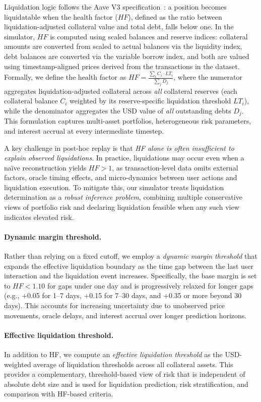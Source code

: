 \documentclass[manuscript,screen,review]{acmart}
\begin{document}
Liquidation logic follows the Aave V3 specification~\cite{aave_liquidations}: a position becomes liquidatable when the health factor ($HF$), defined as the ratio between liquidation-adjusted collateral value and total debt, falls below one. In the simulator, $HF$ is computed using scaled balances and reserve indices: collateral amounts are converted from scaled to actual balances via the liquidity index, debt balances are converted via the variable borrow index, and both are valued using timestamp-aligned prices derived from the transactions in the dataset. Formally, we define the health factor as $HF = \frac{\sum_{i} C_i \cdot LT_i}{\sum_{j} D_j}$, where the numerator aggregates liquidation-adjusted collateral across \emph{all} collateral reserves (each collateral balance $C_i$ weighted by its reserve-specific liquidation threshold $LT_i$), while the denominator aggregates the USD value of \emph{all} outstanding debts $D_j$. This formulation captures multi-asset portfolios, heterogeneous risk parameters, and interest accrual at every intermediate timestep.

A key challenge in post-hoc replay is that \emph{HF alone is often insufficient to explain observed liquidations}. In practice, liquidations may occur even when a naïve reconstruction yields $HF > 1$, as transaction-level data omits external factors, oracle timing effects, and micro-dynamics between user actions and liquidation execution. To mitigate this, our simulator treats liquidation determination as a \emph{robust inference problem}, combining multiple conservative views of portfolio risk and declaring liquidation feasible when any such view indicates elevated risk.

\paragraph{Dynamic margin threshold.}
Rather than relying on a fixed cutoff, we employ a \emph{dynamic margin threshold} that expands the effective liquidation boundary as the time gap between the last user interaction and the liquidation event increases. Specifically, the base margin is set to $HF < 1.10$ for gaps under one day and is progressively relaxed for longer gaps (e.g., +0.05 for 1--7 days, +0.15 for 7--30 days, and +0.35 or more beyond 30 days). This accounts for increasing uncertainty due to unobserved price movements, oracle delays, and interest accrual over longer prediction horizons.

\paragraph{Effective liquidation threshold.}
In addition to HF, we compute an \emph{effective liquidation threshold} as the USD-weighted average of liquidation thresholds across all collateral assets. This provides a complementary, threshold-based view of risk that is independent of absolute debt size and is used for liquidation prediction, risk stratification, and comparison with HF-based criteria.
\end{document}
